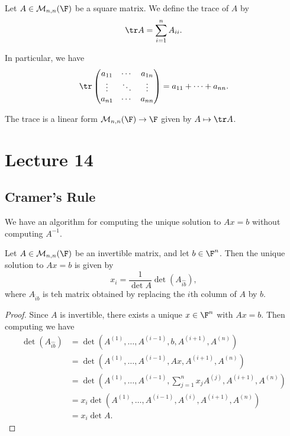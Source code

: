 \documentclass[a4paper]{scrartcl}
\begin{document}
\begin{definition}[Trace]
    Let $A \in \mathcal{M}_{n, n}(\F)$ be a square matrix. We define the trace of $A$ by
    $$
    \tr A = \sum_{i = 1}^n A_{ii}.
    $$
\end{definition}

In particular, we have
$$
\tr \begin{pmatrix}
    a_{11} & \cdots & a_{1n} \\
    \vdots & \ddots & \vdots \\
    a_{n1} & \cdots & a_{nn}
\end{pmatrix} = a_{11} + \cdots + a_{nn}.
$$

\begin{remark}
    The trace is a linear form $\mathcal{M}_{n,n}(\F) \rightarrow \F$ given by $A \mapsto \tr A$.
\end{remark}

\begin{lemma}
    
\end{lemma}

\section{Lecture 14}

\subsection{Cramer's Rule}

We have an algorithm for computing the unique solution to $Ax = b$ without computing $A^{-1}$.

\begin{proposition}
    Let $A \in \mathcal{M}_{n , n}(\F)$ be an invertible matrix, and let $b \in \F^n$. Then the unique solution to $Ax = b$ is given by
    $$
    x_i = \frac{1}{\det A} \det(A_{\hat{ib}}),
    $$
    where $A_{\hat{i}b}$ is teh matrix obtained by replacing the $i$th column of $A$ by $b$.
\end{proposition}
\begin{proof}
    Since $A$ is invertible, there exists a unique $x \in \F^n$ with $Ax = b$. Then
    computing we have
    \begin{align*}
        \det(A_{\hat{ib}}) &= \det(A^{(1)}, \dots, A^{(i - 1)}, b, A^{(i + 1)}, A^{(n)}) \\
        &= \det(A^{(1)}, \dots, A^{(i - 1)}, Ax, A^{(i + 1)}, A^{(n)}) \\
        &= \det(A^{(1)}, \dots, A^{(i - 1)}, \sum_{j = 1}^n x_j A^{(j)}, A^{(i + 1)}, A^{(n)}) \\
        &= x_i \det(A^{(1)}, \dots, A^{(i - 1)}, A^{(i)}, A^{(i + 1)}, A^{(n)})  \\
        &= x_i \det A.
    \end{align*}
\end{proof}
\end{document}
